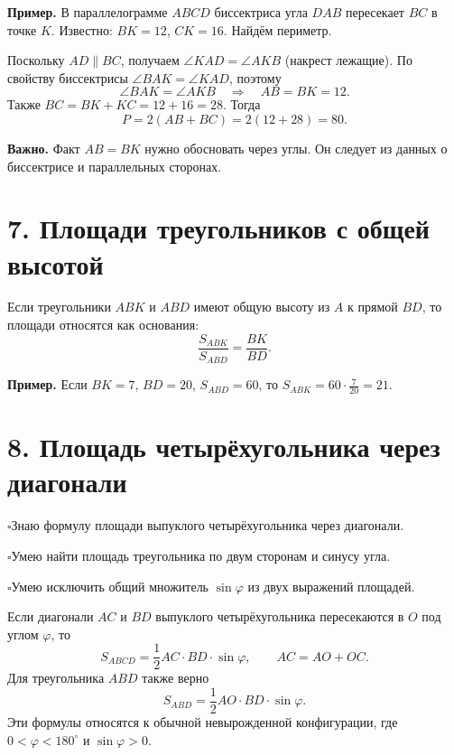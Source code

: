 \documentclass[a4paper,12pt]{article}
\newcommand{\checkline}[1]{\par\noindent\textcolor{accent}{$\square$}\hspace{5pt}#1\par}
\newcommand{\ex}[1]{\par\smallskip\textcolor{darkaccent}{\textbf{Пример.}} #1\par}
\newcommand{\warn}[1]{\par\textbf{Важно.} #1\par}
\begin{document}
\ex{В параллелограмме $ABCD$ биссектриса угла $DAB$ пересекает $BC$ в точке $K$. Известно: $BK=12$, $CK=16$. Найдём периметр.}
\begin{center}
\end{center}
Поскольку $AD\parallel BC$, получаем $\angle KAD=\angle AKB$ (накрест лежащие). По свойству биссектрисы $\angle BAK=\angle KAD$, поэтому
\[
\angle BAK=\angle AKB\quad\Longrightarrow\quad AB=BK=12.
\]
Также $BC=BK+KC=12+16=28$. Тогда
\[
\boxed{P=2(AB+BC)=2(12+28)=80}.
\]
\warn{Факт $AB=BK$ нужно обосновать через углы. Он следует из данных о биссектрисе и параллельных сторонах.}

\section*{7. Площади треугольников с общей высотой}
Если треугольники $ABK$ и $ABD$ имеют общую высоту из $A$ к прямой $BD$, то площади относятся как основания:
\[
\boxed{\frac{S_{ABK}}{S_{ABD}}=\frac{BK}{BD}}.
\]
\ex{Если $BK=7$, $BD=20$, $S_{ABD}=60$, то $S_{ABK}=60\cdot\frac7{20}=21$.}

\clearpage
\section*{8. Площадь четырёхугольника через диагонали}
\checkline{Знаю формулу площади выпуклого четырёхугольника через диагонали.}
\checkline{Умею найти площадь треугольника по двум сторонам и синусу угла.}
\checkline{Умею исключить общий множитель $\sin\varphi$ из двух выражений площадей.}

Если диагонали $AC$ и $BD$ выпуклого четырёхугольника пересекаются в $O$ под углом $\varphi$, то
\[
\boxed{S_{ABCD}=\frac12 AC\cdot BD\cdot\sin\varphi},
\qquad AC=AO+OC.
\]
Для треугольника $ABD$ также верно
\[
S_{ABD}=\frac12 AO\cdot BD\cdot\sin\varphi.
\]
Эти формулы относятся к обычной невырожденной конфигурации, где $0<\varphi<180^\circ$ и $\sin\varphi>0$.
\end{document}
